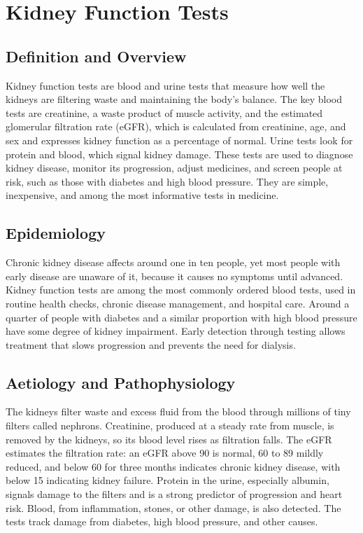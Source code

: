 \chapter{Kidney Function Tests}

\section*{Definition and Overview}
Kidney function tests are blood and urine tests that measure how well the kidneys are filtering waste and maintaining the body's balance. The key blood tests are creatinine, a waste product of muscle activity, and the estimated glomerular filtration rate (eGFR), which is calculated from creatinine, age, and sex and expresses kidney function as a percentage of normal. Urine tests look for protein and blood, which signal kidney damage. These tests are used to diagnose kidney disease, monitor its progression, adjust medicines, and screen people at risk, such as those with diabetes and high blood pressure. They are simple, inexpensive, and among the most informative tests in medicine.

\section*{Epidemiology}
Chronic kidney disease affects around one in ten people, yet most people with early disease are unaware of it, because it causes no symptoms until advanced. Kidney function tests are among the most commonly ordered blood tests, used in routine health checks, chronic disease management, and hospital care. Around a quarter of people with diabetes and a similar proportion with high blood pressure have some degree of kidney impairment. Early detection through testing allows treatment that slows progression and prevents the need for dialysis.

\section*{Aetiology and Pathophysiology}
The kidneys filter waste and excess fluid from the blood through millions of tiny filters called nephrons. Creatinine, produced at a steady rate from muscle, is removed by the kidneys, so its blood level rises as filtration falls. The eGFR estimates the filtration rate: an eGFR above 90 is normal, 60 to 89 mildly reduced, and below 60 for three months indicates chronic kidney disease, with below 15 indicating kidney failure. Protein in the urine, especially albumin, signals damage to the filters and is a strong predictor of progression and heart risk. Blood, from inflammation, stones, or other damage, is also detected. The tests track damage from diabetes, high blood pressure, and other causes.

